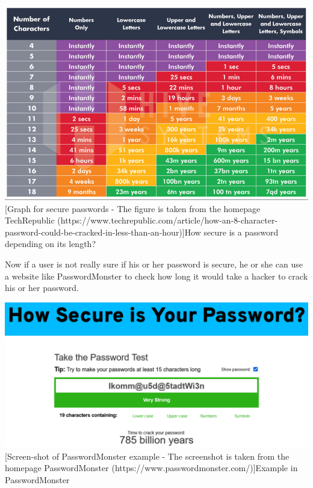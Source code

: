\documentclass[conference]{IEEEtran}
\begin{document}
\begin{center}
    \includegraphics[scale=0.335]{./images/brute_force.png}
    [Graph for secure passwords - The figure is taken from the homepage TechRepublic (https://www.techrepublic.com/article/how-an-8-character-password-could-be-cracked-in-less-than-an-hour)]{How secure is a password depending on its length?}
\end{center}

Now if a user is not really sure if his or her password is secure, he or she can use a website like PasswordMonster to check how long it would take a hacker to crack his or her password.\cite{b9}

\begin{center}
    \includegraphics[scale=0.37]{./images/PasswordMonster.png}
    [Screen-shot of PasswordMonster example  - The screenshot is taken from the homepage PasswordMonster (https://www.passwordmonster.com/)]{Example in PasswordMonster}
\end{center}
\end{document}

